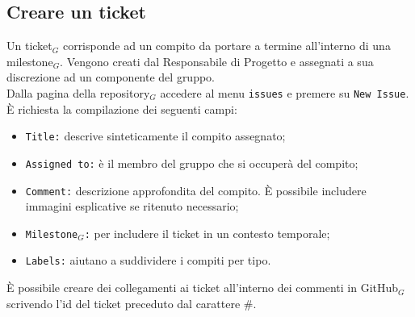 \subsection{Creare un ticket}
Un ticket$_{G}$ corrisponde ad un compito da portare a termine all'interno di una milestone$_{G}$. Vengono creati dal Responsabile di Progetto e assegnati a sua discrezione ad un componente del gruppo. \\
Dalla pagina della repository$_{G}$ accedere al menu \texttt{issues} e premere su \texttt{New Issue}.\\
È richiesta la compilazione dei seguenti campi:
\begin{itemize}
    \item \texttt{Title:} descrive sinteticamente il compito assegnato;
    \item \texttt{Assigned to:} è il membro del gruppo che si occuperà del compito;
    \item \texttt{Comment:} descrizione approfondita del compito. È possibile includere immagini esplicative se ritenuto necessario;
    \item \texttt{Milestone$_{G}$:} per includere il ticket in un contesto temporale;
    \item \texttt{Labels:} aiutano a suddividere i compiti per tipo.
\end{itemize}
È possibile creare dei collegamenti ai ticket all'interno dei commenti in GitHub$_{G}$ scrivendo l'id del ticket preceduto dal carattere \#.

